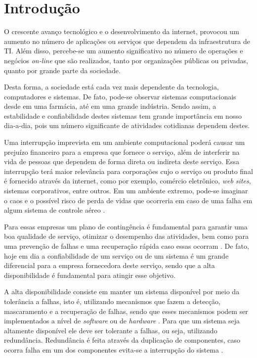 \chapter{Introdução}
O crescente avanço tecnológico e o desenvolvimento da internet, provocou um aumento no número de aplicações ou serviços que dependem da 
infraestrutura de TI. Além disso, percebe-se um aumento significativo no número de operações e negócios \textit{on-line} que são realizados, 
tanto por organizações públicas ou privadas, quanto por grande parte da sociedade.

Desta forma, a sociedade está cada vez mais dependente da tecnologia, computadores e sistemas. 
De fato, pode-se observar sistemas computacionais desde em uma farmácia, até em uma grande indústria. 
Sendo assim, a estabilidade e confiabilidade destes sistemas tem grande importância em nosso dia-a-dia, 
pois um número significante de atividades cotidianas dependem destes.

Uma interrupção imprevista em um ambiente computacional poderá causar um prejuízo financeiro para a empresa que fornece o serviço, 
além de interferir na vida de pessoas que dependem de forma direta ou indireta deste serviço. 
Essa interrupção terá maior relevância para corporações cujo o serviço ou produto final é fornecido através da internet, 
como por exemplo, comércio eletrônico, \textit{web sites}, sistemas corporativos, entre outros. 
Em um ambiente extremo, pode-se imaginar o caos e o possível risco de perda de vidas que ocorreria em caso de uma falha 
em algum sistema de controle aéreo \cite{costa2009}.

Para essas empresas um plano de contingência é fundamental para garantir uma boa qualidade de serviço, 
otimizar o desempenho das atividades, bem como para uma prevenção de falhas e uma recuperação rápida caso essas ocorram \cite{costa2009}.
De fato, hoje em dia a confiabilidade de um serviço ou de um sistema é um grande diferencial para a empresa fornecedora deste serviço, 
sendo que a alta disponibilidade é fundamental para atingir esse objetivo.

A alta disponibilidade consiste em manter um sistema disponível por meio da tolerância a falhas, isto é, utilizando mecanismos que fazem a 
detecção, mascaramento e a recuperação de falhas, sendo que esses mecanismos podem ser implementados a nível de \textit{software} ou de 
\textit{hardware} \cite{reis2009}. Para que um sistema seja altamente disponível ele deve ser tolerante a falhas, ou seja, utilizando redundância.
Redundância é feita através da duplicação de componentes, caso ocorra falha em um dos componentes evita-se a interrupção do sistema 
\cite{batista2007}.

